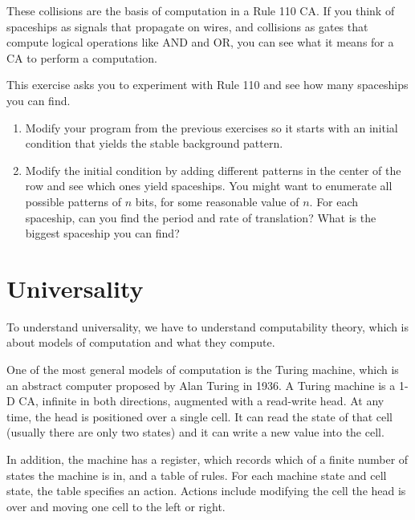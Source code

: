 \documentclass[10pt]{book}
\begin{document}
These collisions are the basis of computation in a Rule 110 CA.  If
you think of spaceships as signals that propagate on wires, and
collisions as gates that compute logical operations like AND and OR,
you can see what it means for a CA to perform a computation.

\begin{ex}

This exercise asks you to experiment with Rule 110 and see how
many spaceships you can find.

\begin{enumerate}

\item Modify your program from the previous exercises so it starts
  with an initial condition that yields the stable background
  pattern.

\item Modify the initial condition by adding different patterns in the
  center of the row and see which ones yield spaceships.  You might
  want to enumerate all possible patterns of $n$ bits, for some
  reasonable value of $n$.  For each spaceship, can you find the
  period and rate of translation?  What is the biggest spaceship you
  can find?

\end{enumerate}

\end{ex}


\section{Universality}

To understand universality, we have to understand computability
theory, which is about models of computation and what they compute.

One of the most general models of computation is the Turing machine,
which is an abstract computer proposed by Alan Turing in 1936.  A
Turing machine is a 1-D CA, infinite in both directions, augmented
with a read-write head.  At any time, the head is positioned over a
single cell.  It can read the state of that cell (usually there are
only two states) and it can write a new value into the cell.

In addition, the machine has a register, which records which
of a finite number of states the machine is in, and a table
of rules.  For each machine state and cell state, the table
specifies an action.  Actions include modifying the cell
the head is over and moving one cell to the left or right.
\end{document}
